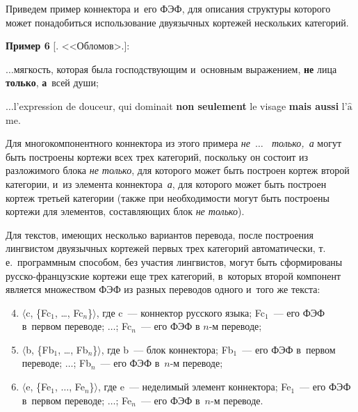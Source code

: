 \begin{multicols}{2}
  Приведем пример коннектора и~его ФЭФ, для описания структуры 
которого может понадобиться использование двуязычных кортежей 
нескольких категорий.
  
  \smallskip
  
  \noindent
   \textbf{Пример 6} [. <<Обломов>.]:
   
  $\ldots$мягкость, которая была господствующим и~основ\-ным выражением, \textbf{не} 
лица \textbf{только}, \textbf{а}~всей \mbox{души};
  
  $\ldots$l'expression de douceur, qui dominait \textbf{non seulement} le visage \textbf{mais 
aussi} l'$\hat{\mbox{a}}$me.
  
  Для многокомпонентного коннектора из этого примера \textit{не\ $\ldots$ 
\  только,~а} могут быть построены кортежи всех трех категорий, поскольку 
он состоит из разложимого блока \textit{не только}, для которого может быть 
построен кортеж второй категории, и~из элемента коннектора~\textit{а}, для 
которого может быть построен кортеж третьей категории (также при 
необходимости могут быть построены кортежи для элементов, составляющих 
блок \textit{не только}).
  
  Для текстов, имеющих несколько вариантов перевода, после построения 
лингвистом двуязычных кортежей первых трех категорий автоматически, 
т.\,е.\ программным способом, без участия лингвистов, могут быть 
сформированы рус\-ско-фран\-цуз\-ские кортежи еще трех категорий, 
в~которых второй компонент является множеством ФЭФ из разных 
переводов одного и~того же текста:
  \begin{enumerate}[(1)]
  \setcounter{enumi}{3}
\item $\langle$c, \{Fc$_1$, \ldots, Fc$_n$\}$\rangle$, где c~--- коннектор русского 
языка; Fc$_1$~--- его ФЭФ в~первом переводе; $\ldots$; Fc$_n$~--- его ФЭФ 
в $n$-м переводе;
\item $\langle$b, \{Fb$_1$, \ldots, Fb$_n$\}$\rangle$, где b~--- блок коннектора; 
Fb$_1$~--- его ФЭФ в~первом переводе; $\ldots$; Fb$_n$~--- его ФЭФ 
в~$n$-м переводе;
\item $\langle$e, \{Fe$_1$, $\ldots$, Fe$_n$\}$\rangle$, где e~--- неделимый элемент 
коннектора; Fe$_1$~--- его ФЭФ в~первом переводе; $\ldots$; Fe$_n$~--- его 
ФЭФ в~$n$-м переводе.
  \end{enumerate}
  
  \setcounter{table}{4}
  
    \begin{table*}[b]\small %
    \vspace*{-9pt}
\begin{center}
\vspace*{2ex}


\end{center}
\end{table*}
\end{multicols}
